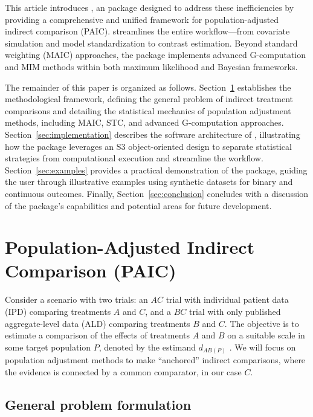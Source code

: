 \documentclass[article]{jss}
\begin{document}
This article introduces , an  package designed to address these inefficiencies by providing a comprehensive and unified framework for population-adjusted indirect comparison (PAIC).  streamlines the entire workflow—from covariate simulation and model standardization to contrast estimation. Beyond standard weighting (MAIC) approaches, the package implements advanced G-computation and MIM methods within both maximum likelihood and Bayesian frameworks.


The remainder of this paper is organized as follows. Section~\ref{sec:methodology} establishes the methodological framework, defining the general problem of indirect treatment comparisons and detailing the statistical mechanics of population adjustment methods, including MAIC, STC, and advanced G-computation approaches. Section~\ref{sec:implementation} describes the software architecture of , illustrating how the package leverages an S3 object-oriented design to separate statistical strategies from computational execution and streamline the workflow. Section~\ref{sec:examples} provides a practical demonstration of the package, guiding the user through illustrative examples using synthetic datasets for binary and continuous outcomes. Finally, Section~\ref{sec:conclusion} concludes with a discussion of the package's capabilities and potential areas for future development.

\section{Population-Adjusted Indirect Comparison (PAIC)}
\label{sec:methodology}
Consider a scenario with two trials: an $AC$ trial with individual patient data (IPD) comparing treatments $A$ and $C$, and a $BC$ trial with only published aggregate-level data (ALD) comparing treatments $B$ and $C$. The objective is to estimate a comparison of the effects of treatments $A$ and $B$ on a suitable scale in some target population $P$, denoted by the estimand $d_{AB(P)}$ \citep{RemiroAzocar2022a}. We will focus on population adjustment methods to make ``anchored'' indirect comparisons, where the evidence is connected by a common comparator, in our case $C$.

\subsection{General problem formulation}
\label{ssec:problem_formulation}
\end{document}

